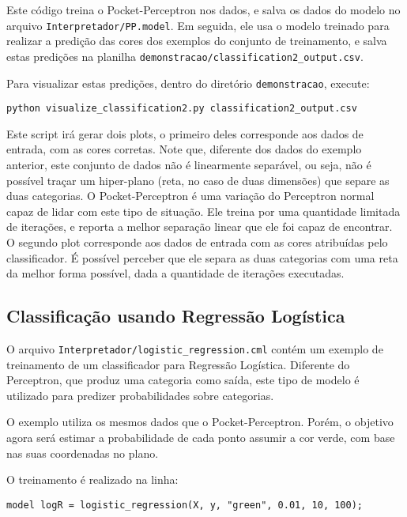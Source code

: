 \documentclass[12pt]{article}
\begin{document}
Este código treina o Pocket-Perceptron nos dados, e salva os dados do modelo no arquivo \texttt{Interpretador/PP.model}. Em seguida, ele usa o modelo treinado para realizar a predição das cores dos exemplos do conjunto de treinamento, e salva estas predições na planilha \texttt{demonstracao/classification2\_output.csv}.

Para visualizar estas predições, dentro do diretório \texttt{demonstracao}, execute:

\begin{verbatim}
python visualize_classification2.py classification2_output.csv
\end{verbatim}

Este script irá gerar dois plots, o primeiro deles corresponde aos dados de entrada, com as cores corretas. Note que, diferente dos dados do exemplo anterior, este conjunto de dados não é linearmente separável, ou seja, não é possível traçar um hiper-plano (reta, no caso de duas dimensões) que separe as duas categorias. O Pocket-Perceptron é uma variação do Perceptron normal capaz de lidar com este tipo de situação. Ele treina por uma quantidade limitada de iterações, e reporta a melhor separação linear que ele foi capaz de encontrar. O segundo plot corresponde aos dados de entrada com as cores atribuídas pelo classificador. É possível perceber que ele separa as duas categorias com uma reta da melhor forma possível, dada a quantidade de iterações executadas.

\subsection{Classificação usando Regressão Logística}

O arquivo \texttt{Interpretador/logistic\_regression.cml} contém um exemplo de treinamento de um classificador para Regressão Logística. Diferente do Perceptron, que produz uma categoria como saída, este tipo de modelo é utilizado para predizer probabilidades sobre categorias.

O exemplo utiliza os mesmos dados que o Pocket-Perceptron. Porém, o objetivo agora será estimar a probabilidade de cada ponto assumir a cor verde, com base nas suas coordenadas no plano.

O treinamento é realizado na linha:

\begin{verbatim}
model logR = logistic_regression(X, y, "green", 0.01, 10, 100);
\end{verbatim}
\end{document}
